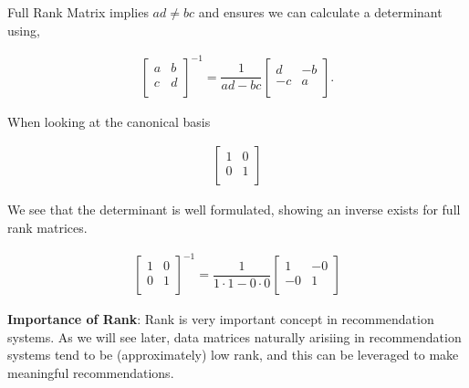 \documentclass[12pt]{article}
\newenvironment{definition}[2][Definition]{\begin{trivlist}
\item[\hskip \labelsep {\bfseries #1}\hskip \labelsep {\bfseries #2}]}{\end{trivlist}}
\newenvironment{corollary}[2][Corollary]{\begin{trivlist}
\item[\hskip \labelsep {\bfseries #1}\hskip \labelsep {\bfseries #2}]}{\end{trivlist}}
\begin{document}
\begin{corollary}{2.1.2} Full Rank Matrix implies \(ad \neq bc\) and ensures we can calculate a determinant using,

\begin{equation}
\begin{split}
\begin{bmatrix}
    a & b \\
    c & d \\
\end{bmatrix}^{-1}
= \dfrac{1}{ad-bc}
\begin{bmatrix}
    d & -b \\
    -c & a \\
\end{bmatrix}.
\end{split}
\end{equation}

\noindent
When looking at the canonical basis

\begin{equation}
\begin{split}
    \begin{bmatrix}
        1 & 0 \\
        0 & 1 \\
    \end{bmatrix}
\end{split}
\end{equation}

\noindent
We see that the determinant is well formulated, showing an inverse exists for full rank matrices.

\begin{equation}
\begin{split}
    \begin{bmatrix}
        1 & 0 \\
        0 & 1 \\
    \end{bmatrix}^{-1}
    = \dfrac{1}{1 \cdot 1-0 \cdot 0}
    \begin{bmatrix}
        1 & -0 \\
        -0 & 1 \\
    \end{bmatrix}
\end{split}
\end{equation}
\end{corollary}

\begin{definition}{2.2} \textbf{Importance of Rank}: Rank is very important concept in recommendation systems. As we will see later, data matrices naturally arisiing in recommendation systems tend to be (approximately) low rank, and this can be leveraged to make meaningful recommendations.
\end{definition}
\end{document}
